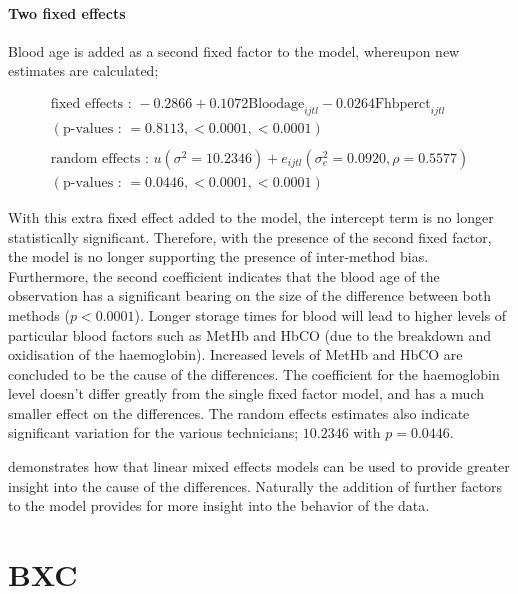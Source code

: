 \documentclass[12pt, a4paper]{report}
\theoremstyle{plain}
\theoremstyle{definition}
\theoremstyle{remark}
\begin{document}
\subsubsection{Two fixed effects}
Blood age is added as a second fixed factor to the model,
whereupon new estimates are calculated;
\begin{framed}
	\begin{eqnarray}
	\mbox{fixed effects :   } -0.2866 + 0.1072 \mbox{Bloodage}_{ijtl}
	- 0.0264\mbox{Fhbperct}_{ijtl}\nonumber\\
	( \mbox{p-values :   } = 0.8113, <0.0001, <0.0001)\nonumber\\\nonumber\\
	\mbox{random effects :   } u(\sigma^{2}=10.2346) + e_{ijtl}
	(\sigma^{2}_{e}=0.0920, \rho= 0.5577) \nonumber\\
	(\mbox{p-values :   } = 0.0446, <0.0001, <0.0001)
	\end{eqnarray}
\end{framed}


With this extra fixed effect added to the model, the intercept
term is no longer statistically significant. Therefore, with the
presence of the second fixed factor, the model is no longer
supporting the presence of inter-method bias. Furthermore, the
second coefficient indicates that the blood age of the observation
has a significant bearing on the size of the difference between
both methods ($p <0.0001$). Longer storage times for blood will
lead to higher levels of particular blood factors such as MetHb
and HbCO (due to the breakdown and oxidisation of the
haemoglobin). Increased levels of MetHb and HbCO are concluded to
be the cause of the differences. The coefficient for the
haemoglobin level doesn't differ greatly from the single fixed
factor model, and has a much smaller effect on the differences.
The random effects estimates also indicate significant variation
for the various technicians; $10.2346$ with $p=0.0446$.

\citet{LaiShiao} demonstrates how that linear mixed effects models
can be used to provide greater insight into the cause of the
differences. Naturally the addition of further factors to the
model provides for more insight into the behavior of the data.







	\chapter{BXC}	
\end{document}
